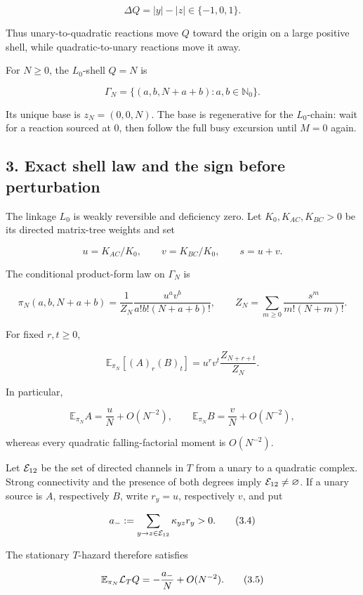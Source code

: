 \[
 \Delta Q=|y|-|z|\in\{-1,0,1\}.                     \tag{2.2}
\]

Thus unary-to-quadratic reactions move \(Q\) toward the origin on a
large positive shell, while quadratic-to-unary reactions move it away.

For \(N\geq0\), the \(L_0\)-shell \(Q=N\) is

\[
 \Gamma_N=\{(a,b,N+a+b):a,b\in\mathbb N_0\}.         \tag{2.3}
\]

Its unique base is \(z_N=(0,0,N)\). The base is regenerative for the
\(L_0\)-chain: wait for a reaction sourced at \(0\), then follow the
full busy excursion until \(M=0\) again.

\subsection{3. Exact shell law and the sign before
perturbation}

The linkage \(L_0\) is weakly reversible and deficiency zero. Let
\(K_0,K_{AC},K_{BC}>0\) be its directed matrix-tree weights and set

\[
 u=K_{AC}/K_0,\qquad v=K_{BC}/K_0,\qquad s=u+v.
\]

The conditional product-form law on \(\Gamma_N\) is

\[
 \pi_N(a,b,N+a+b)
 =\frac1{Z_N}\frac{u^a v^b}{a!b!(N+a+b)!},\qquad
 Z_N=\sum_{m\ge0}\frac{s^m}{m!(N+m)!}.               \tag{3.1}
\]

For fixed \(r,t\geq0\),

\[
 \mathbb E_{\pi_N}[(A)_r(B)_t]
 =u^rv^t\frac{Z_{N+r+t}}{Z_N}.                       \tag{3.2}
\]

In particular,

\[
 \mathbb E_{\pi_N}A=\frac{u}{N}+O(N^{-2}),\qquad
 \mathbb E_{\pi_N}B=\frac{v}{N}+O(N^{-2}),           \tag{3.3}
\]

whereas every quadratic falling-factorial moment is \(O(N^{-2})\).

Let \({\cal E}_{12}\) be the set of directed channels in \(T\) from a
unary to a quadratic complex. Strong connectivity and the presence of
both degrees imply \({\cal E}_{12}\ne\varnothing\). If a unary source is
\(A\), respectively \(B\), write \(r_y=u\), respectively \(v\), and put

\[
 a_-:=\sum_{y\to z\in{\cal E}_{12}}\kappa_{yz}r_y>0. \tag{3.4}
\]

The stationary \(T\)-hazard therefore satisfies

\[
 \mathbb E_{\pi_N}{\cal L}_TQ
 =-\frac{a_-}{N}+O(N^{-2}).                           \tag{3.5}
\]

